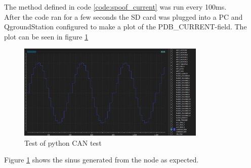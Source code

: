 The method defined in code \ref{code:spoof_current} was run every 100ms.\\
After the code ran for a few seconds the SD card was plugged into a PC and QgroundStation configured to make a plot of the PDB\_CURRENT-field. The plot can be seen in figure \ref{fig:pdb_current_log} 


\begin{figure}[H]
    \center
    \includegraphics[width=0.8\textwidth]{graphics/test_can_spoof_current.png}
    \caption{Test of python CAN test}
    \label{fig:pdb_current_log}
\end{figure}

Figure \ref{fig:pdb_current_log} shows the sinus generated from the node as expected.